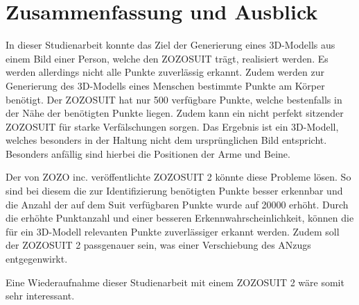 \chapter{Zusammenfassung und Ausblick}

In dieser Studienarbeit konnte das Ziel der Generierung eines 3D-Modells aus einem Bild einer Person, welche den ZOZOSUIT trägt, realisiert werden. \newline
Es werden allerdings nicht alle Punkte zuverlässig erkannt. Zudem werden zur Generierung des 3D-Modells eines Menschen bestimmte Punkte am Körper benötigt. Der ZOZOSUIT hat nur 500 
verfügbare Punkte, welche bestenfalls in der Nähe der benötigten Punkte liegen. Zudem kann ein nicht perfekt sitzender ZOZOSUIT für starke Verfälschungen sorgen.\newline
Das Ergebnis ist ein 3D-Modell, welches besonders in der Haltung nicht dem ursprünglichen Bild entspricht. Besonders anfällig sind hierbei die Positionen der Arme und Beine.

Der von ZOZO inc. veröffentlichte ZOZOSUIT 2 könnte diese Probleme lösen. So sind bei diesem die zur Identifizierung benötigten Punkte besser erkennbar und die Anzahl der auf dem Suit 
verfügbaren Punkte wurde auf 20000 erhöht. \newline
Durch die erhöhte Punktanzahl und einer besseren Erkennwahrscheinlichkeit, können die für ein 3D-Modell relevanten Punkte zuverlässiger erkannt werden. Zudem soll der ZOZOSUIT 2 passgenauer 
sein, was einer Verschiebung des ANzugs entgegenwirkt.

Eine Wiederaufnahme dieser Studienarbeit mit einem ZOZOSUIT 2 wäre somit sehr interessant.